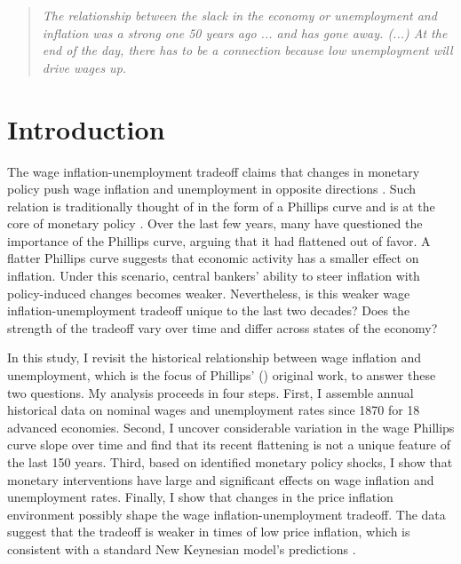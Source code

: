 \documentclass[12pt]{article}
\begin{document}
\clearpage

\begin{quote}
\textit{The relationship between the slack in the economy or unemployment and inflation was a strong one 50 years ago ... and has gone away. (...) At the end of the day, there has to be a connection because low unemployment will drive wages up.} \cite{Powell2019}
\end{quote}


\section{Introduction}
The wage inflation-unemployment tradeoff claims that changes in monetary policy push wage inflation and unemployment in opposite directions \citep{Mankiw2001}. Such relation is traditionally thought of in the form of a Phillips curve and is at the core of monetary policy \citep{Barnichon2019, Eser2020}. Over the last few years, many have questioned the importance of the Phillips curve, arguing that it had flattened out of favor. A flatter Phillips curve suggests that economic activity has a smaller effect on inflation. Under this scenario, central bankers' ability to steer inflation with policy-induced changes becomes weaker. Nevertheless, is this weaker wage inflation-unemployment tradeoff unique to the last two decades? Does the strength of the tradeoff vary over time and differ across states of the economy?


In this study, I revisit the historical relationship between wage inflation and unemployment, which is the focus of Phillips' (\citeyear{Phillips1958}) original work, to answer these two questions. My analysis proceeds in four steps. First, I assemble annual historical data on nominal wages and unemployment rates since 1870 for 18 advanced economies. Second, I uncover considerable variation in the wage Phillips curve slope over time and find that its recent flattening is not a unique feature of the last 150 years. Third, based on identified monetary policy shocks, I show that monetary interventions have large and significant effects on wage inflation and unemployment rates. Finally, I show that changes in the price inflation environment possibly shape the wage inflation-unemployment tradeoff. The data suggest that the tradeoff is weaker in times of low price inflation, which is consistent with a standard New Keynesian model's predictions \citep{Benati2007}.
\end{document}

